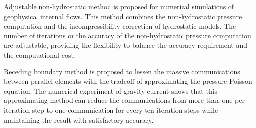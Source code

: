 Adjustable non-hydrostatic method is proposed for numerical simulations of geophysical internal flows. This method combines the non-hydrostatic pressure computation and the incompressibility correction of hydrostatic models. The number of iterations or the accuracy of the non-hydrostatic pressure computation are adjustable, providing the flexibility to balance the accuracy requirement and the computational cost.

Receding boundary method is proposed to lessen the massive communications between parallel elements with the tradeoff of approximating the pressure Poisson equation. The numerical experiment of gravity current shows that this approximating method can reduce the communications from more than one per iteration step to one communication for every ten iteration steps while maintaining the result with satisfactory accuracy. 